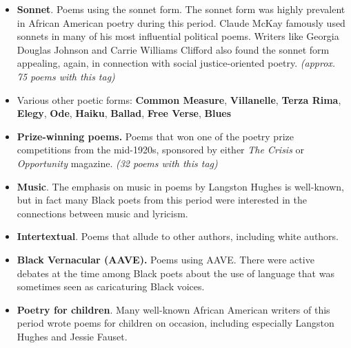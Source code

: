 \documentclass[
  letterpaper,
  DIV=11,
  numbers=noendperiod]{scrartcl}
\providecommand{\tightlist}{%
  \setlength{\itemsep}{0pt}\setlength{\parskip}{0pt}}\usepackage{longtable,booktabs,array}
\begin{document}
\begin{itemize}
\tightlist
\item
  \textbf{Sonnet}. Poems using the sonnet form. The sonnet form was
  highly prevalent in African American poetry during this period. Claude
  McKay famously used sonnets in many of his most influential political
  poems. Writers like Georgia Douglas Johnson and Carrie Williams
  Clifford also found the sonnet form appealing, again, in connection
  with social justice-oriented poetry. \emph{(approx. 75 poems with this
  tag)}
\item
  Various other poetic forms: \textbf{Common Measure},
  \textbf{Villanelle}, \textbf{Terza Rima}, \textbf{Elegy},
  \textbf{Ode}, \textbf{Haiku}, \textbf{Ballad}, \textbf{Free Verse},
  \textbf{Blues}
\item
  \textbf{Prize-winning poems. }Poems that won one of the poetry prize
  competitions from the mid-1920s, sponsored by either \emph{The Crisis}
  or \emph{Opportunity} magazine. \emph{(32 poems with this tag)}
\item
  \textbf{Music}. The emphasis on music in poems by Langston Hughes is
  well-known, but in fact many Black poets from this period were
  interested in the connections between music and lyricism.
\item
  \textbf{Intertextual}. Poems that allude to other authors, including
  white authors.
\item
  \textbf{Black Vernacular (AAVE). }Poems using AAVE. There were active
  debates at the time among Black poets about the use of language that
  was sometimes seen as caricaturing Black voices.
\item
  \textbf{Poetry for children}. Many well-known African American writers
  of this period wrote poems for children on occasion, including
  especially Langston Hughes and Jessie Fauset.
\end{itemize}
\end{document}
